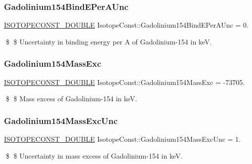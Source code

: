 \subsubsection{\texorpdfstring{Gadolinium154\+Bind\+E\+Per\+A\+Unc}{Gadolinium154BindEPerAUnc}}
{\footnotesize\ttfamily \mbox{\hyperlink{group___isotope_const-_macros_ga8f45a7272ce02c0b4c65c44636ed719a}{I\+S\+O\+T\+O\+P\+E\+C\+O\+N\+S\+T\+\_\+\+D\+O\+U\+B\+LE}} Isotope\+Const\+::\+Gadolinium154\+Bind\+E\+Per\+A\+Unc = 0.}

\$ \$ Uncertainty in binding energy per A of Gadolinium-\/154 in keV. \mbox{\label{group___isotope_const-_gadolinium-_gd154_gae682ca2283a894a0e39d93b7993897c0}} 
\subsubsection{\texorpdfstring{Gadolinium154\+Mass\+Exc}{Gadolinium154MassExc}}
{\footnotesize\ttfamily \mbox{\hyperlink{group___isotope_const-_macros_ga8f45a7272ce02c0b4c65c44636ed719a}{I\+S\+O\+T\+O\+P\+E\+C\+O\+N\+S\+T\+\_\+\+D\+O\+U\+B\+LE}} Isotope\+Const\+::\+Gadolinium154\+Mass\+Exc = -\/73705.}

\$ \$ Mass excess of Gadolinium-\/154 in keV. \mbox{\label{group___isotope_const-_gadolinium-_gd154_ga17df328adfa3e700771470af3e8cc2bb}} 
\subsubsection{\texorpdfstring{Gadolinium154\+Mass\+Exc\+Unc}{Gadolinium154MassExcUnc}}
{\footnotesize\ttfamily \mbox{\hyperlink{group___isotope_const-_macros_ga8f45a7272ce02c0b4c65c44636ed719a}{I\+S\+O\+T\+O\+P\+E\+C\+O\+N\+S\+T\+\_\+\+D\+O\+U\+B\+LE}} Isotope\+Const\+::\+Gadolinium154\+Mass\+Exc\+Unc = 1.}

\$ \$ Uncertainty in mass excess of Gadolinium-\/154 in keV. \mbox{\label{group___isotope_const-_gadolinium-_gd154_ga6f581e58bd79852c8562ca54c6fb79e9}} 
